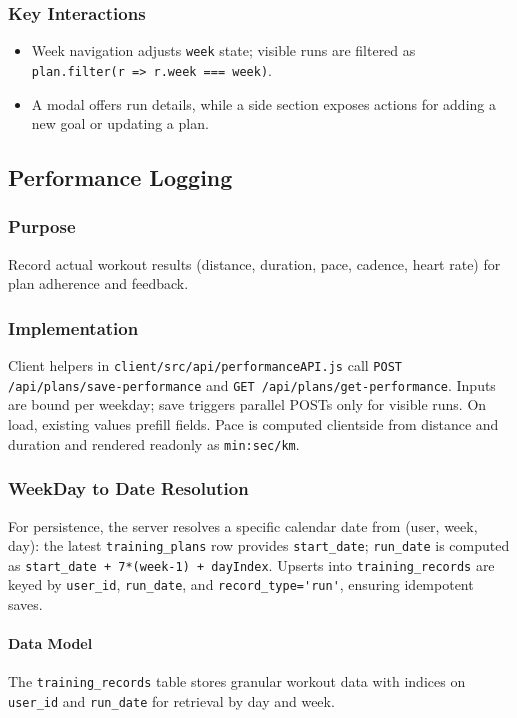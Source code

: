 \subsubsection{Key Interactions}
\begin{itemize}
  \item Week navigation adjusts \verb|week| state; visible runs are filtered as \verb|plan.filter(r => r.week === week)|.
  \item A modal offers run details, while a side section exposes actions for adding a new goal or updating a plan.
\end{itemize}

\subsection{Performance Logging}
\subsubsection{Purpose}
Record actual workout results (distance, duration, pace, cadence, heart rate) for plan adherence and feedback.

\subsubsection{Implementation}
Client helpers in \verb|client/src/api/performanceAPI.js| call \verb|POST /api/plans/save-performance| and \verb|GET /api/plans/get-performance|. Inputs are bound per weekday; save triggers parallel POSTs only for visible runs. On load, existing values prefill fields. Pace is computed client\-side from distance and duration and rendered read\-only as \verb|min:sec/km|.

\subsubsection{Week\/Day to Date Resolution}
For persistence, the server resolves a specific calendar date from (user, week, day): the latest \verb|training_plans| row provides \verb|start_date|; \verb|run_date| is computed as \verb|start_date + 7*(week-1) + dayIndex|. Upserts into \verb|training_records| are keyed by \verb|user_id|, \verb|run_date|, and \verb|record_type='run'|, ensuring idempotent saves.

\paragraph{Data Model}
The \verb|training_records| table stores granular workout data with indices on \verb|user_id| and \verb|run_date| for retrieval by day and week.

